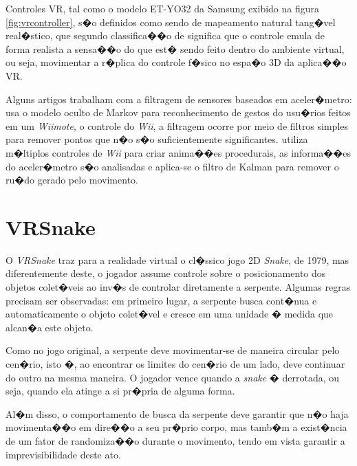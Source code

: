 \documentclass[12pt]{article}
\begin{document}

Controles VR, tal como o modelo ET-YO32 da Samsung exibido na figura \ref{fig:vrcontroller}, s�o definidos como sendo de mapeamento natural tang�vel real�stico, que segundo classifica��o de \cite{skalski2011mapping} significa que o controle emula de forma realista a sensa��o do que est� sendo feito dentro do ambiente virtual, ou seja, movimentar a r�plica do controle f�sico no espa�o 3D da aplica��o VR.


Alguns artigos trabalham com a filtragem de sensores baseados em aceler�metro: \cite{schlomer2008gesture} usa o modelo oculto de Markov para reconhecimento de gestos do usu�rios feitos em um \textit{Wiimote}, o controle do \textit{Wii}, a filtragem ocorre por meio de filtros simples para remover pontos que n�o s�o suficientemente significantes. \cite{shiratori2008accelerometer} utiliza m�ltiplos controles de \textit{Wii} para criar anima��es procedurais, as informa��es do aceler�metro s�o analisadas e aplica-se o filtro de Kalman para remover o ru�do  gerado pelo movimento.

\section{VRSnake} \label{sec:vrsnake}
O \textit{VRSnake} traz para a realidade virtual o cl�ssico jogo 2D \textit{Snake}, de 1979, mas diferentemente deste, o jogador assume controle sobre o posicionamento dos objetos colet�veis ao inv�s de controlar diretamente a serpente. Algumas regras precisam ser observadas: em primeiro lugar, a serpente busca cont�nua e automaticamente o objeto colet�vel e cresce em uma unidade � medida que alcan�a este objeto. 

Como no jogo original, a serpente deve movimentar-se de maneira circular pelo cen�rio, isto �, ao encontrar os limites do cen�rio de um lado, deve continuar do outro na mesma maneira. O jogador vence quando a \textit{snake} � derrotada, ou seja, quando ela atinge a si pr�pria de alguma forma. 

Al�m disso, o comportamento de busca da serpente deve garantir que n�o haja movimenta��o em dire��o a seu pr�prio corpo, mas tamb�m a exist�ncia de um fator de randomiza��o durante o movimento, tendo em vista garantir a imprevisibilidade deste ato.
\end{document}
